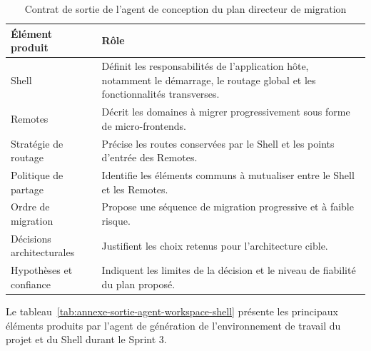 \begingroup
\renewcommand{\arraystretch}{1.12}
\setlength{\tabcolsep}{4pt}
\begin{longtable}{|p{4cm}|p{9.2cm}|}
\caption{Contrat de sortie de l'agent de conception du plan directeur de migration}\label{tab:annexe-sortie-agent-plan-directeur}\\
\hline
\textbf{Élément produit} & \textbf{Rôle} \\
\hline
Shell & Définit les responsabilités de l'application hôte, notamment le démarrage, le routage global et les fonctionnalités transverses. \\
\hline
Remotes & Décrit les domaines à migrer progressivement sous forme de micro-frontends. \\
\hline
Stratégie de routage & Précise les routes conservées par le Shell et les points d'entrée des Remotes. \\
\hline
Politique de partage & Identifie les éléments communs à mutualiser entre le Shell et les Remotes. \\
\hline
Ordre de migration & Propose une séquence de migration progressive et à faible risque. \\
\hline
Décisions architecturales & Justifient les choix retenus pour l'architecture cible. \\
\hline
Hypothèses et confiance & Indiquent les limites de la décision et le niveau de fiabilité du plan proposé. \\
\hline
\end{longtable}
\endgroup


Le tableau~\ref{tab:annexe-sortie-agent-workspace-shell} présente les principaux éléments produits par l'agent de génération de l'environnement de travail du projet et du Shell durant le Sprint 3.

